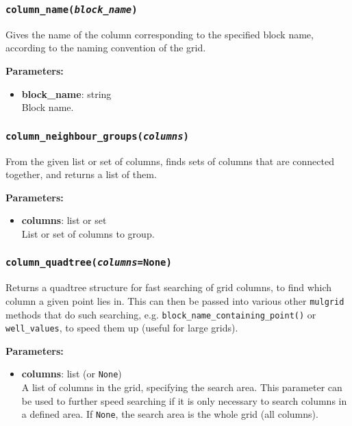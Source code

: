 \subsubsection{\texttt{column\_name(\emph{block\_name})}}
\label{sec:column_name}

Gives the name of the column corresponding to the specified block name, according to the naming convention of the grid.

\textbf{Parameters:}
\begin{itemize}
\item \textbf{block\_name}: string\\
  Block name.
\end{itemize}

\subsubsection{\texttt{column\_neighbour\_groups(\emph{columns})}}
\label{sec:column_neighbour_groups}

From the given list or set of columns, finds sets of columns that are connected together, and returns a list of them.

\textbf{Parameters:}
\begin{itemize}
\item \textbf{columns}: list or set\\
  List or set of columns to group.
\end{itemize}

\subsubsection{\texttt{column\_quadtree(\emph{columns}=None)}}
\label{sec:column_quadtree}

Returns a quadtree structure for fast searching of grid columns, to find which column a given point lies in.  This can then be passed into various other \texttt{mulgrid} methods that do such searching, e.g. \texttt{block\_name\_containing\_point()} or \texttt{well\_values}, to speed them up (useful for large grids).

\textbf{Parameters:}
\begin{itemize}
\item \textbf{columns}: list (or \texttt{None})\\
  A list of columns in the grid, specifying the search area.  This parameter can be used to further speed searching if it is only necessary to search columns in a defined area.  If \texttt{None}, the search area is the whole grid (all columns).
\end{itemize}

